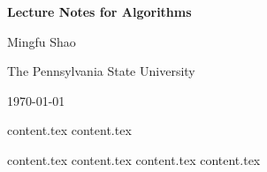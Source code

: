 \documentclass[letterpaper,11pt]{article}
\theoremstyle{mytheorem}
\begin{document}

\thispagestyle{titlestyle}
\begin{center}
\vspace*{4cm} {\huge \bf Lecture Notes for Algorithms } \vspace*{2cm}

{\large  Mingfu Shao}

{\large  The Pennsylvania State University}

{\large  \today}
\end{center}

\clearpage \newpage


\makeatletter
\renewcommand{\l@section}{\@dottedtocline{1}{0em}{5em}}
\makeatother

\thispagestyle{tablestyle}
\tableofcontents \thispagestyle{tablestyle} \clearpage \newpage

{content.tex} \clearpage\newpage
{content.tex} \clearpage\newpage

{content.tex} \clearpage\newpage
{content.tex} \clearpage\newpage
{content.tex} \clearpage\newpage
{content.tex} \clearpage\newpage
\end{document}
